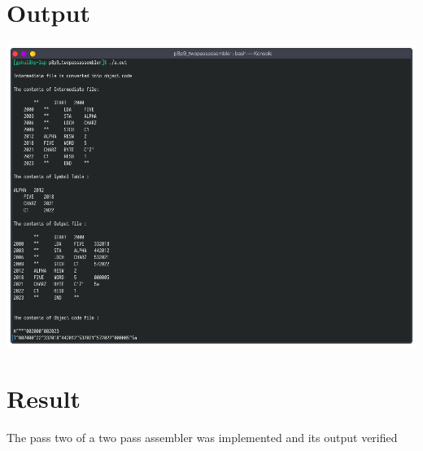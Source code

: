 \documentclass[13pt,oneside]{book}
\begin{document}
    \section*{Output}
    \includegraphics[width=\textwidth]{img/p9.png}
    
\Large
\section*{Result}
\large
The pass two of a two pass assembler was implemented and its output verified
\end{document}
